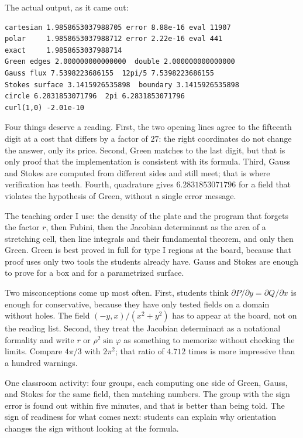 The actual output, as it came out:

\begin{verbatim}
cartesian 1.9858653037988705 error 8.88e-16 eval 11907
polar     1.9858653037988712 error 2.22e-16 eval 441
exact     1.9858653037988714
Green edges 2.000000000000000  double 2.000000000000000
Gauss flux 7.5398223686155  12pi/5 7.5398223686155
Stokes surface 3.1415926535898  boundary 3.1415926535898
circle 6.2831853071796  2pi 6.2831853071796
curl(1,0) -2.01e-10
\end{verbatim}

Four things deserve a reading. First, the two opening lines agree to the fifteenth digit at a cost that differs
by a factor of $27$: the right coordinates do not change the answer, only
its price. Second, Green matches to the last digit, but that is
only proof that the implementation is consistent with its formula. Third, Gauss and Stokes are
computed from different sides and still meet; that is where verification has teeth.
Fourth, quadrature gives $6.2831853071796$ for a field that violates the hypothesis of
Green, without a single error message.

\begin{untukdosen}
The teaching order I use: the density of the plate and the program that forgets the factor
$r$, then Fubini, then the Jacobian determinant as the area of a stretching cell,
then line integrals and their fundamental theorem, and only then Green. Green is best proved
in full for type I regions at the board, because that proof uses only two tools
the students already have. Gauss and Stokes are enough to prove for a box and for a
parametrized surface.

Two misconceptions come up most often. First, students think
$\partial P/\partial y=\partial Q/\partial x$ is enough for conservative, because
they have only tested fields on a domain without holes. The field
$(-y,x)/(x^{2}+y^{2})$ has to appear at the board, not on the reading list. Second,
they treat the Jacobian determinant as a notational formality and write
$r$ or $\rho^{2}\sin\varphi$ as something to memorize without checking the limits.
Compare $4\pi/3$ with $2\pi^{2}$; that ratio of $4.712$ times is more impressive
than a hundred warnings.

One classroom activity: four groups, each computing one side of
Green, Gauss, and Stokes for the same field, then matching numbers. The group
with the sign error is found out within five minutes, and that is better than being told.
The sign of readiness for what comes next: students can explain why orientation
changes the sign without looking at the formula.
\end{untukdosen}

